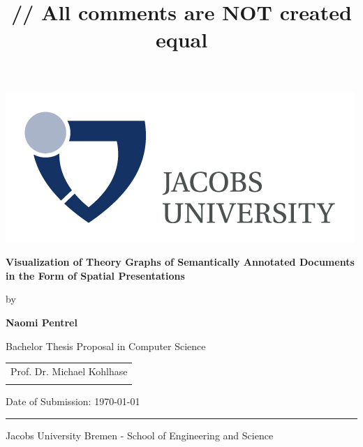 \documentclass[twoside]{article}
\title{\vspace{-15mm}\fontsize{24pt}{10pt}\selectfont\textbf{// All comments are NOT created equal}} %
\begin{document}
\thispagestyle{empty}
\begin{flushright}
    \includegraphics[scale=1.0]{Logo}
  \end{flushright}
  \vspace{20mm}
  \begin{center}
    \huge
    \textbf{Visualization of Theory Graphs of Semantically Annotated Documents in the Form of Spatial Presentations}
  \end{center}
  \vspace*{4mm}
  \begin{center}
   \Large by
  \end{center}
  \vspace*{4mm}
  \begin{center}
    \Large
    \textbf{Naomi Pentrel}
  \end{center}
  \vspace*{20mm}
  \begin{center}
    \large
    Bachelor Thesis Proposal in Computer Science
  \end{center}
  \vfill
  \begin{flushright}
    \large
    \begin{tabular}{l}
      
      \hline
      Prof. Dr. Michael Kohlhase \\
      \\
    \end{tabular}
  \end{flushright}
  \vspace*{8mm}
  \begin{flushleft}
    \large
    Date of Submission: \today \\
    \rule{\textwidth}{1pt}
  \end{flushleft}
  \begin{center}
    \Large Jacobs University Bremen - School of Engineering and Science
  \end{center}
\end{document}
